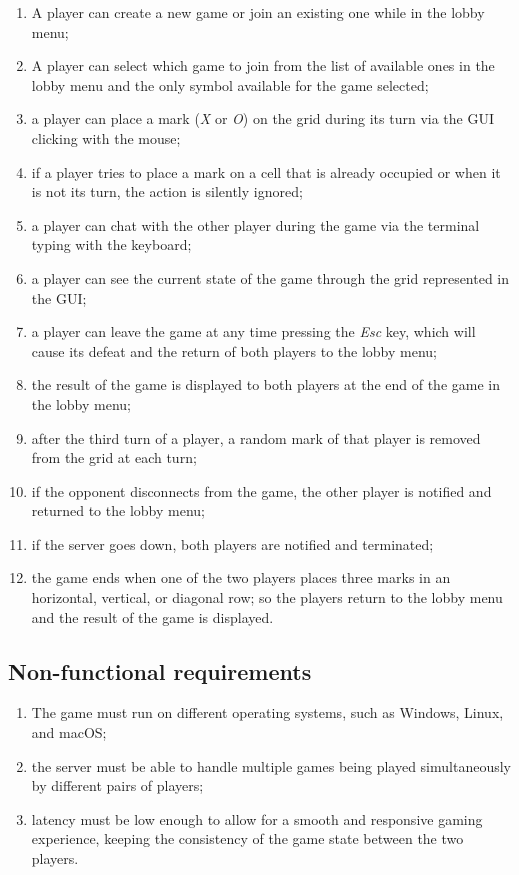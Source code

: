 \documentclass{scrartcl}
\begin{document}
\begin{enumerate}
  \item A player can create a new game or join an existing one while in the lobby menu;
  \item A player can select which game to join from the list of available ones in the lobby menu and the only symbol
  available for the game selected;
  \item a player can place a mark (\textit{X} or \textit{O}) on the grid during its turn via the GUI clicking with
  the mouse;
  \item if a player tries to place a mark on a cell that is already occupied or when it is not its turn, the action
  is silently ignored;
  \item a player can chat with the other player during the game via the terminal typing with the keyboard;
  \item a player can see the current state of the game through the grid represented in the GUI;
  \item a player can leave the game at any time pressing the \textit{Esc} key, which will cause its defeat and the
  return of both players to the lobby menu;
  \item the result of the game is displayed to both players at the end of the game in the lobby menu;
  \item after the third turn of a player, a random mark of that player is removed from the grid at each turn;
  \item if the opponent disconnects from the game, the other player is notified and returned to the lobby menu;
  \item if the server goes down, both players are notified and terminated;
  \item the game ends when one of the two players places three marks in an horizontal, vertical, or diagonal row;
  so the players return to the lobby menu and the result of the game is displayed.
\end{enumerate}

\subsection{Non-functional requirements}\label{non-functional-requirements}

\begin{enumerate}
  \item The game must run on different operating systems, such as Windows, Linux, and macOS;
  \item the server must be able to handle multiple games being played simultaneously by different pairs of players;
  \item latency must be low enough to allow for a smooth and responsive gaming experience, keeping the consistency
  of the game state between the two players.
\end{enumerate}
\end{document}
